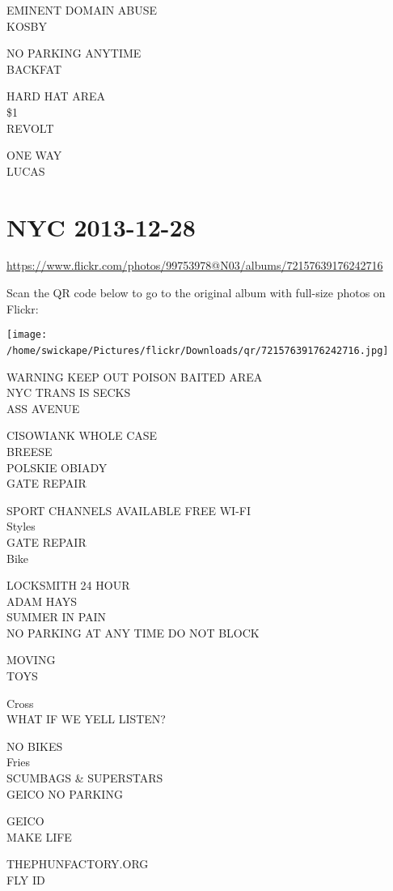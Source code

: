 \documentclass[10pt,letterpaper]{article}
\begin{document}
EMINENT DOMAIN ABUSE\\
KOSBY

NO PARKING ANYTIME\\
BACKFAT

HARD HAT AREA\\
\$1\\
REVOLT

ONE WAY\\
LUCAS
\

\section*{NYC 2013-12-28}

\url{https://www.flickr.com/photos/99753978@N03/albums/72157639176242716}

Scan the QR code below to go to the original album with full-size photos on Flickr:

\texttt{[image: /home/swickape/Pictures/flickr/Downloads/qr/72157639176242716.jpg]}
\

WARNING KEEP OUT POISON BAITED AREA\\
NYC TRANS IS SECKS\\
ASS AVENUE

CISOWIANK WHOLE CASE\\
BREESE\\
POLSKIE OBIADY\\
GATE REPAIR

SPORT CHANNELS AVAILABLE FREE WI{-}FI\\
Styles\\
GATE REPAIR\\
Bike

LOCKSMITH 24 HOUR\\
ADAM HAYS\\
SUMMER IN PAIN\\
NO PARKING AT ANY TIME DO NOT BLOCK

MOVING\\
TOYS

Cross\\
WHAT IF WE YELL LISTEN?

NO BIKES\\
Fries\\
SCUMBAGS \& SUPERSTARS\\
GEICO NO PARKING

GEICO\\
MAKE LIFE

THEPHUNFACTORY.ORG\\
FLY ID
\end{document}
